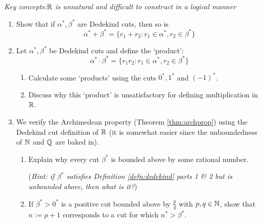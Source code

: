 \begin{exercises}{}{}
	\emph{Key concepts:\quad $\mathbb{R}$ is unnatural and difficult to construct in a logical manner}



	\begin{enumerate}%
	  \item Show that if $\alpha^*,\beta^*$ are Dedekind cuts, then so is
  	\[
  		\alpha^*+\beta^*=\{r_1+r_2:r_1\in\alpha^*,r_2\in\beta^*\}
  	\]
	  
	  
	  \item %
	  Let $\alpha^*,\beta^*$ be Dedekind cuts and define the `product':
	  \[
	  	\alpha^*\cdot\beta^*=\{r_1r_2:r_1\in\alpha^*,r_2\in\beta^*\}
	  \]
	  \begin{enumerate}
	  	\item Calculate some `products' using the cuts $0^*,1^*$ and $(-1)^*$.
	  	\item Discuss why this `product' is unsatisfactory for defining multiplication in $\mathbb{R}$.
	  \end{enumerate}
	  
	  
	  \item We verify the Archimedean property (Theorem \ref{thm:archprop}) using the Dedekind cut definition of $\mathbb{R}$ (it is somewhat easier since the unboundedness of $\mathbb{N}$ and $\mathbb{Q}$ are baked in).
	  \begin{enumerate}
	    \item Explain why every cut $\beta^*$ is bounded above by some rational number.\par
	    (\emph{Hint: if $\beta^*$ satisfies Definition \ref{defn:dedekind} parts 1 \& 2 but is unbounded above, then what is it?})
	    \item If $\beta^*>0^*$ is a positive cut bounded above by $\frac pq$ with $p,q\in\mathbb{N}$, show that $n:=p+1$ corresponds to a cut for which $n^*>\beta^*$.
		\end{enumerate}
	\end{enumerate}
\end{exercises}
